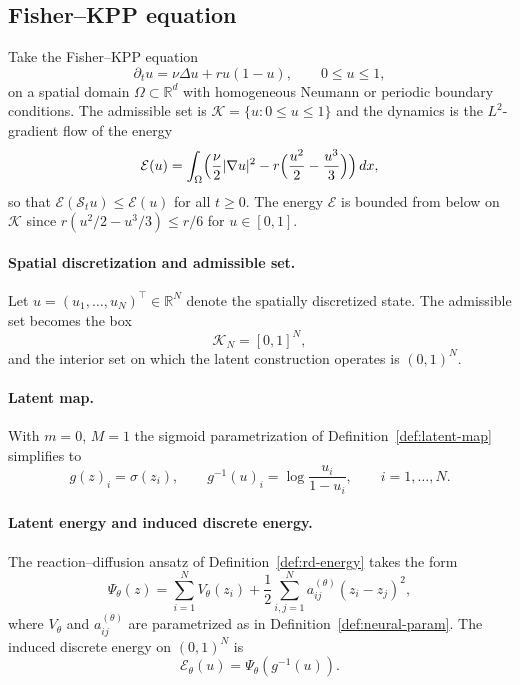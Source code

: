 \documentclass[hidelinks,review,nohypdvips,onefignum,onetabnum]{siamart220329}
\newcommand{\R}{\mathbb{R}}
\newcommand{\cS}{\mathcal{S}}
\newcommand{\cK}{\mathcal{K}}
\newcommand{\cE}{\mathcal{E}}
\begin{document}
\subsection{Fisher--KPP equation}\label{subsec:fisher-kpp}
Take the Fisher--KPP equation
\begin{equation}\label{eq:fisher-kpp-bench}
\partial_t u = \nu \Delta u + r u(1-u), \qquad 0\le u\le 1,
\end{equation}
on a spatial domain $\Omega\subset\R^d$ with homogeneous Neumann or periodic boundary conditions. The admissible set is $\cK=\{u:0\le u\le 1\}$ and the dynamics is the $L^2$-gradient flow of the energy
\begin{equation}\label{eq:fisher-energy}
\cE(u)=\int_\Omega\Bigl(\frac{\nu}{2}|\nabla u|^2 - r\Bigl(\frac{u^2}{2}-\frac{u^3}{3}\Bigr)\Bigr)\,dx,
\end{equation}
so that $\cE(\cS_t u)\le\cE(u)$ for all $t\ge 0$. The energy $\cE$ is bounded from below on $\cK$ since $r(u^2/2-u^3/3)\le r/6$ for $u\in [0,1]$.

\paragraph{Spatial discretization and admissible set.}
Let $u=(u_1,\dots,u_N)^\top\in\R^N$ denote the spatially discretized state. The admissible set becomes the box
\begin{equation}\label{eq:KN-fisher}
\cK_N=[0,1]^N,
\end{equation}
and the interior set on which the latent construction operates is $(0,1)^N$.

\paragraph{Latent map.}
With $m=0$, $M=1$ the sigmoid parametrization of Definition~\ref{def:latent-map} simplifies to
\begin{equation}\label{eq:g-fisher}
g(z)_i=\sigma(z_i),\qquad g^{-1}(u)_i=\log\frac{u_i}{1-u_i},\qquad i=1,\dots,N.
\end{equation}

\paragraph{Latent energy and induced discrete energy.}
The reaction--diffusion ansatz of Definition~\ref{def:rd-energy} takes the form
\begin{equation}\label{eq:psi-fisher}
\Psi_{\theta}(z)=\sum_{i=1}^N V_{\theta}(z_i)+\frac12\sum_{i,j=1}^N a_{ij}^{(\theta)}(z_i-z_j)^2,
\end{equation}
where $V_{\theta}$ and $a_{ij}^{(\theta)}$ are parametrized as in Definition~\ref{def:neural-param}. The induced discrete energy on $(0,1)^N$ is
\begin{equation}\label{eq:Etheta-fisher}
\cE_{\theta}(u)=\Psi_{\theta}(g^{-1}(u)).
\end{equation}
\end{document}
